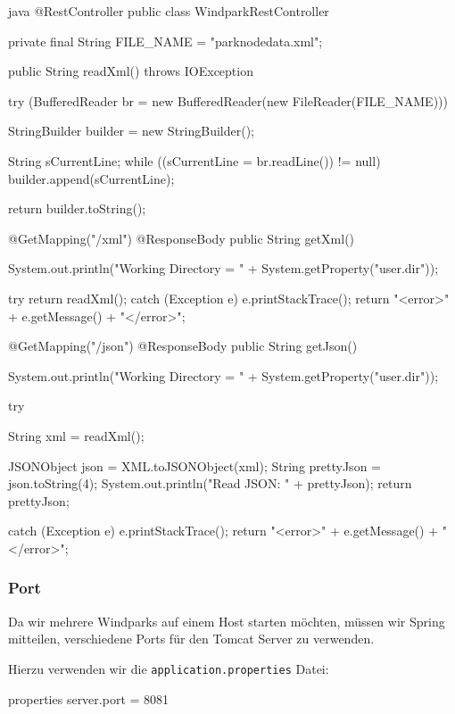 \begin{code}{java}
    @RestController
    public class WindparkRestController {

        private final String FILE_NAME = "parknodedata.xml";

        public String readXml() throws IOException {
            try (BufferedReader br = new BufferedReader(new FileReader(FILE_NAME))) {
                StringBuilder builder = new StringBuilder();

                String sCurrentLine;
                while ((sCurrentLine = br.readLine()) != null) {
                    builder.append(sCurrentLine);
                }

                return builder.toString();
            }
        }

        @GetMapping("/xml")
        @ResponseBody
        public String getXml() {
            System.out.println("Working Directory = " + System.getProperty("user.dir"));

            try {
                return readXml();
            } catch (Exception e) {
                e.printStackTrace();
                return "<error>" + e.getMessage() + "</error>";
            }
        }


        @GetMapping("/json")
        @ResponseBody
        public String getJson() {
            System.out.println("Working Directory = " + System.getProperty("user.dir"));

            try {
                String xml = readXml();

                JSONObject json = XML.toJSONObject(xml);
                String prettyJson = json.toString(4);
                System.out.println("Read JSON: " + prettyJson);
                return prettyJson;
            } catch (Exception e) {
                e.printStackTrace();
                return "<error>" + e.getMessage() + "</error>";
            }
        }
    }
\end{code}

\subsubsection{Port}

Da wir mehrere Windparks auf einem Host starten möchten, müssen wir Spring mitteilen, verschiedene Ports für den Tomcat Server zu verwenden.

Hierzu verwenden wir die \texttt{application.properties} Datei:

\begin{code}{properties}
    server.port = 8081
\end{code}


